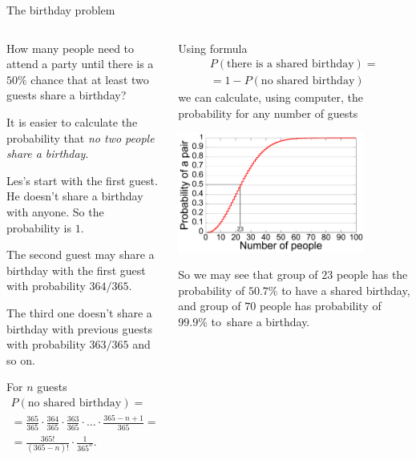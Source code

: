 \documentclass[9pt,aspectratio=169]{beamer}
\begin{document}
\begin{frame}{The birthday problem}
  \begin{columns}[T]
    \begin{column}{0.5\textwidth}
      \begin{problem}
        How many people need to attend a party until there is a $50\%$ chance that at least two guests share a birthday?
      \end{problem}
      It is easier to calculate the probability that \emph{no two people share a birthday}. 
      
      Les's start with the first guest. He doesn't share a birthday with anyone. So the probability is $1$.
      
      The second guest may share a birthday with the first guest with probability $364/365$. 
      
      The third one doesn't share a birthday with previous guests with probability $363/365$ and so on. 
      
      For $n$ guests
      \begin{multline*}
        P(\text{no shared birthday}) = \\
        = \frac{365}{365} \cdot \frac{364}{365} \cdot \frac{363}{365} \cdot \ldots \cdot \frac{365 - n + 1}{365} = \\ = \frac{365!}{(365-n)!} \cdot \frac{1}{365^n}.
      \end{multline*}
    \end{column}
    \begin{column}{0.5\textwidth}
      Using formula 
      \begin{multline*}
         P(\text{there is a shared birthday}) = \\ 
         = 1 - P(\text{no shared birthday})
      \end{multline*}
      we can calculate, using computer, the probability for any number of guests
      \begin{center}
        \vspace*{-1ex}   
        \includegraphics[width = 0.80\textwidth]{03 - Probability/Birthday_Paradox.pdf}
        \vspace*{-1ex}   
      \end{center} 
      So we may see that group of $23$ people has the probability of $50.7\%$ to have a shared birthday, and group of $70$ people has probability of $99.9\%$ to~share a birthday.
    \end{column}
  \end{columns}
\end{frame}
\end{document}
